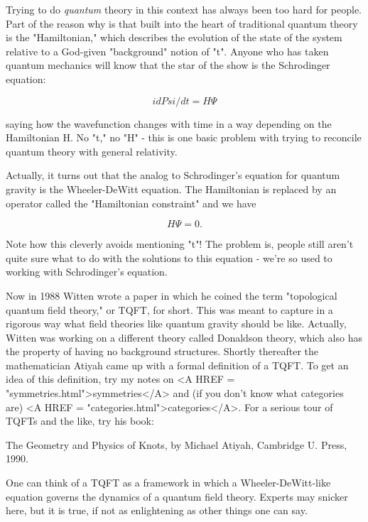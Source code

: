 Trying to do \emph{quantum} theory in this context has always been too hard
for people.  Part of the reason why is that built into the heart of
traditional quantum theory is the "Hamiltonian," which describes the
evolution of the state of the system relative to a God-given
"background" notion of "t".  Anyone who has taken quantum mechanics will
know that the star of the show is the Schrodinger equation:


$$

                      i dPsi/dt = H \Psi 
$$
    

saying how the wavefunction \Psi  changes with time in a way depending on
the Hamiltonian H.  No "t," no "H" - this is one basic problem with
trying to reconcile quantum theory with general relativity.

Actually, it turns out that the analog to Schrodinger's equation for
quantum gravity is the Wheeler-DeWitt equation.  The Hamiltonian is
replaced by an operator called the "Hamiltonian constraint" and we have


$$

                         H \Psi  = 0.
$$
    

Note how this cleverly avoids mentioning "t"!  The problem is, people
still aren't quite sure what to do with the solutions to this equation -
we're so used to working with Schrodinger's equation.

Now in 1988 Witten wrote a paper in which he coined the term
"topological quantum field theory," or TQFT, for short.  This was meant
to capture in a rigorous way what field theories like quantum gravity
should be like.  Actually, Witten was working on a different theory
called Donaldson theory, which also has the property of having no
background structures.  Shortly thereafter the mathematician Atiyah came
up with a formal definition of a TQFT.   To get an idea of this
definition, try my notes on <A HREF = "symmetries.html">symmetries</A> and 
(if you don't know what categories are) <A HREF = "categories.html">categories</A>.
For a serious tour of TQFTs and the like, try his book:

The Geometry and Physics of Knots, by Michael Atiyah, Cambridge U.
Press, 1990.

One can think of a TQFT as a framework in which a Wheeler-DeWitt-like
equation governs the dynamics of a quantum field theory.  Experts may
snicker here, but it is true, if not as enlightening as other things one
can say.  

